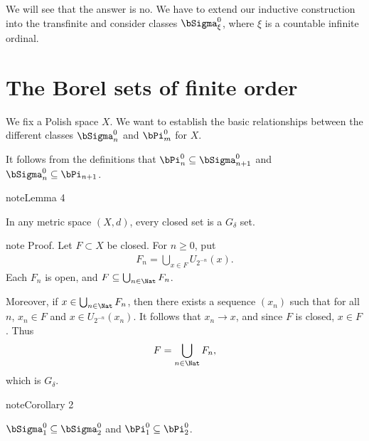 \documentclass[letterpaper,10pt,english]{jupyterBook}
\begin{document}
\sphinxAtStartPar
We will see that the answer is no. We have to extend our inductive construction into the transfinite and consider classes \(\bSigma^0_\xi\), where \(\xi\) is a countable infinite ordinal.


\section{The Borel sets of finite order}
\label{\detokenize{Borel:the-borel-sets-of-finite-order}}
\sphinxAtStartPar
We fix a Polish space \(X\). We want to establish the basic relationships between the different classes \(\bSigma^0_n\) and \(\bPi^0_m\) for \(X\).

\sphinxAtStartPar
It follows from the definitions that \(\bPi^0_n \subseteq \bSigma^0_{n+1}\) and \(\bSigma^0_n \subseteq \bPi_{n+1}\).
\label{Borel:closed-is-Gdelta}
\begin{sphinxadmonition}{note}{Lemma 4}



\sphinxAtStartPar
In any metric space \((X,d)\), every closed set is a \(G_\delta\) set.
\end{sphinxadmonition}

\begin{sphinxadmonition}{note}
\sphinxAtStartPar
Proof. Let \(F \subset X\) be closed. For \(n \geq 0\), put
\begin{equation*}
\begin{split}
F_n = \bigcup_{x \in F} U_{2^{-n}}(x).
\end{split}
\end{equation*}
\sphinxAtStartPar
Each \(F_n\) is open, and \(F \subseteq \bigcup_{n \in \Nat} F_n\).

\sphinxAtStartPar
Moreover, if \(x \in \bigcup_{n \in \Nat} F_n\), then there exists a sequence \((x_n)\) such that for all \(n\), \(x_n \in F\) and \(x \in U_{2^{-n}}(x_n)\). It follows that \(x_n \to x\), and since \(F\) is closed, \(x\in F\). Thus
\begin{equation*}
\begin{split}
F = \bigcup_{n \in \Nat} F_n,
\end{split}
\end{equation*}
\sphinxAtStartPar
which is \(G_\delta\).
\end{sphinxadmonition}
\label{Borel:cor-weak-Borel-hierarchy-1}
\begin{sphinxadmonition}{note}{Corollary 2}



\sphinxAtStartPar
\(\bSigma^0_1 \subseteq \bSigma^0_2\) and \(\bPi^0_1 \subseteq \bPi^0_2\).
\end{sphinxadmonition}
\end{document}
